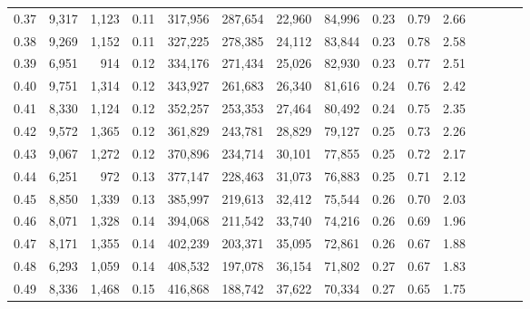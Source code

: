 \begin{tabular}{rrrcrrrrrrrrrrr}
0.37 &   9,317 &  1,123 &                                       0.11 &  317,956 &  287,654 &   22,960 &   84,996 &  0.23 &  0.79 &                         2.66 \\
0.38 &   9,269 &  1,152 &                                       0.11 &  327,225 &  278,385 &   24,112 &   83,844 &  0.23 &  0.78 &                         2.58 \\
0.39 &   6,951 &    914 &                                       0.12 &  334,176 &  271,434 &   25,026 &   82,930 &  0.23 &  0.77 &                         2.51 \\
0.40 &   9,751 &  1,314 &                                       0.12 &  343,927 &  261,683 &   26,340 &   81,616 &  0.24 &  0.76 &                         2.42 \\
0.41 &   8,330 &  1,124 &                                       0.12 &  352,257 &  253,353 &   27,464 &   80,492 &  0.24 &  0.75 &                         2.35 \\
0.42 &   9,572 &  1,365 &                                       0.12 &  361,829 &  243,781 &   28,829 &   79,127 &  0.25 &  0.73 &                         2.26 \\
0.43 &   9,067 &  1,272 &                                       0.12 &  370,896 &  234,714 &   30,101 &   77,855 &  0.25 &  0.72 &                         2.17 \\
0.44 &   6,251 &    972 &                                       0.13 &  377,147 &  228,463 &   31,073 &   76,883 &  0.25 &  0.71 &                         2.12 \\
0.45 &   8,850 &  1,339 &                                       0.13 &  385,997 &  219,613 &   32,412 &   75,544 &  0.26 &  0.70 &                         2.03 \\
0.46 &   8,071 &  1,328 &                                       0.14 &  394,068 &  211,542 &   33,740 &   74,216 &  0.26 &  0.69 &                         1.96 \\
0.47 &   8,171 &  1,355 &                                       0.14 &  402,239 &  203,371 &   35,095 &   72,861 &  0.26 &  0.67 &                         1.88 \\
0.48 &   6,293 &  1,059 &                                       0.14 &  408,532 &  197,078 &   36,154 &   71,802 &  0.27 &  0.67 &                         1.83 \\
0.49 &   8,336 &  1,468 &                                       0.15 &  416,868 &  188,742 &   37,622 &   70,334 &  0.27 &  0.65 &                         1.75 \\

\end{tabular}
